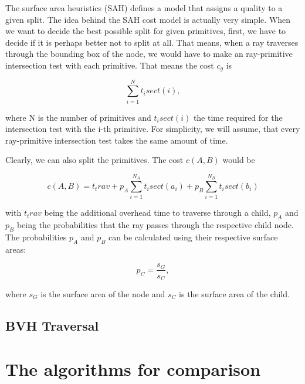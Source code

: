 The surface area heuristics (SAH) defines a model that assigns a quality to a given split. The idea behind the SAH cost model is actually very simple. When we want to decide the best possible split for given primitives, first, we have to decide if it is perhaps better not to split at all. That means, when a ray traverses through the bounding box of the node, we would have to make an ray-primitive intersection test with each primitive. That means the cost $c_g$ is 

\begin{equation}
\sum_{i = 1}^{N}t_isect(i),
\end{equation}

where N is the number of primitives and $t_isect(i)$ the time required for the intersection test with the i-th primitive. For simplicity, we will assume, that every ray-primitive intersection test takes the same amount of time.

Clearly, we can also split the primitives. The cost $c(A,B)$ would be

\begin{equation}
c(A,B) = t_trav + p_A\sum_{i=1}^{N_A}t_isect(a_i) + p_B\sum_{i=1}^{N_B}t_isect(b_i)
\end{equation}

with $t_trav$ being the additional overhead time to traverse through a child, $p_A$ and $p_B$ being the probabilities that the ray passes through the respective child node. The probabilities $p_A$ and $p_B$ can be calculated using their respective surface areas:

\begin{equation}
p_C = \frac{s_G}{s_C},
\end{equation}

where $s_G$ is the surface area of the node and $s_C$ is the surface area of the child.

\subsection{BVH Traversal}

\section{The algorithms for comparison}
\label{sec:preliminaries:com}